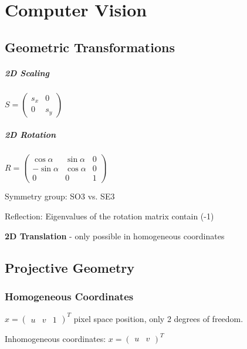 \chapter{Computer Vision}

\section{Geometric Transformations}

\paragraph{2D Scaling}

$S = \left( \begin{matrix} s_x & 0 \\ 0 & s_y  \end{matrix} \right)$

\paragraph{2D Rotation}

$R = \left(\begin{matrix} \cos  \alpha & \sin \alpha  & 0 \\  -\sin \alpha & \cos \alpha & 0 \\ 0 & 0 & 1  \end{matrix} \right)$

Symmetry group: SO3 vs. SE3

Reflection: Eigenvalues of the rotation matrix contain (-1)

\textbf{2D Translation} - only possible in homogeneous coordinates

\section{Projective Geometry}

\subsection{Homogeneous Coordinates}

$x = \left(\begin{matrix} u & v & 1 \end{matrix}\right)^T$ pixel space position, only 2 degrees of freedom.

Inhomogeneous coordinates: $x = (\begin{matrix} u & v \end{matrix})^T $


